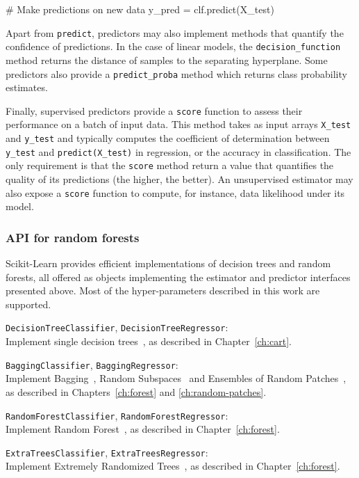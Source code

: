 \vskip0.3cm
\begin{pythoncode}
# Make predictions on new data
y_pred = clf.predict(X_test)
\end{pythoncode}

Apart from \texttt{predict}, predictors may also implement methods that
quantify the confidence of predictions. In the case of linear models, the
\texttt{decision\_function} method returns the distance of samples to the
separating hyperplane. Some predictors also provide a \texttt{predict\_proba}
method which returns class probability estimates.

Finally, supervised predictors provide a \texttt{score} function to assess
their performance on a batch of input data. This method takes as input arrays
\texttt{X\_test} and \texttt{y\_test} and typically computes the coefficient of
determination between \texttt{y\_test} and \texttt{predict(X\_test)} in
regression, or the accuracy in classification. The only requirement is that the
\texttt{score} method return a value that quantifies the quality of its
predictions (the higher, the better). An unsupervised estimator may also expose
a \texttt{score} function to compute, for instance, data likelihood under its
model.

\subsubsection{API for random forests}

Scikit-Learn provides efficient implementations of decision trees and random
forests, all offered as objects implementing the estimator and predictor
interfaces presented above. Most of the hyper-parameters described
in this work are supported.

\begin{description}
\item \texttt{DecisionTreeClassifier}, \texttt{DecisionTreeRegressor}: \hfill \\
    Implement single decision trees~\citep{breiman:1984}, as described in Chapter~\ref{ch:cart}.

\item \texttt{BaggingClassifier}, \texttt{BaggingRegressor}: \hfill \\
    Implement Bagging~\citep{breiman:1996b}, Random Subspaces~\citep{ho:1998}
    and Ensembles of Random Patches~\citep{louppe:2012}, as described in Chapters~\ref{ch:forest}
    and \ref{ch:random-patches}.

\item \texttt{RandomForestClassifier}, \texttt{RandomForestRegressor}: \hfill \\
    Implement Random Forest~\citep{breiman:2001},  as described in Chapter~\ref{ch:forest}.

\item \texttt{ExtraTreesClassifier}, \texttt{ExtraTreesRegressor}: \hfill \\
    Implement Extremely Randomized Trees~\citep{geurts:2006},  as described in Chapter~\ref{ch:forest}.
\end{description}


